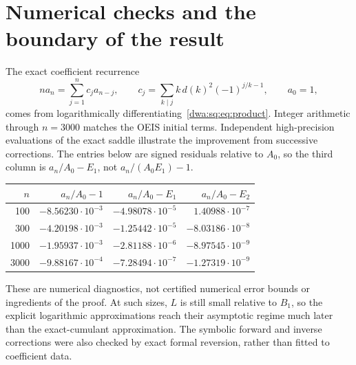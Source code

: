 \documentclass[11pt,letterpaper]{article}
\numberwithin{equation}{section}
\theoremstyle{remark}
\begin{document}
\section{Numerical checks and the boundary of the result}\label{dwa:sq:sec:scope}
The exact coefficient recurrence
\begin{equation}\label{dwa:sq:eq:recurrence}
 na_n=\sum_{j=1}^n c_j a_{n-j},\qquad
 c_j=\sum_{k\mid j}k\,d(k)^2(-1)^{j/k-1},\qquad a_0=1,
\end{equation}
comes from logarithmically differentiating~\eqref{dwa:sq:eq:product}. Integer arithmetic through $n=3000$ matches the OEIS initial terms. Independent high-precision evaluations of the exact saddle illustrate the improvement from successive corrections. The entries below are signed residuals relative to $A_0$, so the third column is $a_n/A_0-E_1$, not $a_n/(A_0E_1)-1$.
\begin{center}
\begin{tabular}{r r r r}
\toprule
$n$ & $a_n/A_0-1$ & $a_n/A_0-E_1$ & $a_n/A_0-E_2$\\
\midrule
100  & $-8.56230\cdot10^{-3}$ & $-4.98078\cdot10^{-5}$ & $ 1.40988\cdot10^{-7}$\\
300  & $-4.20198\cdot10^{-3}$ & $-1.25442\cdot10^{-5}$ & $-8.03186\cdot10^{-8}$\\
1000 & $-1.95937\cdot10^{-3}$ & $-2.81188\cdot10^{-6}$ & $-8.97545\cdot10^{-9}$\\
3000 & $-9.88167\cdot10^{-4}$ & $-7.28494\cdot10^{-7}$ & $-1.27319\cdot10^{-9}$\\
\bottomrule
\end{tabular}
\end{center}
These are numerical diagnostics, not certified numerical error bounds or ingredients of the proof. At such sizes, $L$ is still small relative to $B_1$, so the explicit logarithmic approximations reach their asymptotic regime much later than the exact-cumulant approximation. The symbolic forward and inverse corrections were also checked by exact formal reversion, rather than fitted to coefficient data.
\end{document}
